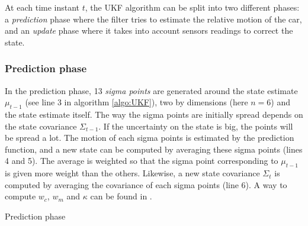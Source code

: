 \documentclass[10pt,a4paper, twocolumn]{article}
\begin{document}
At each time instant $t$, the UKF algorithm can be split into two different phases: a \textit{prediction} phase where the filter tries to estimate the relative motion of the car, and an \textit{update} phase where it takes into account sensors readings to correct the state.

\subsubsection{Prediction phase}
In the prediction phase, 13 \textit{sigma points} are generated around the state estimate $\mu_{t-1}$ (see line 3 in algorithm \ref{algo:UKF}), two by dimensions (here $n=6$) and the state estimate itself. The way the sigma points are initially spread depends on the state covariance $\Sigma_{t-1}$. If the uncertainty on the state is big, the points will be spread a lot. The motion of each sigma points is estimated by the prediction function, and a new state can be computed by averaging these sigma points (lines 4 and 5). The average is weighted so that the sigma point corresponding to $\mu_{t-1}$ is given more weight than the others. Likewise, a new state covariance $\Sigma_t$ is computed by averaging the covariance of each sigma points (line 6). A way to compute $w_c$, $w_m$ and $\kappa$ can be found in \cite{UKFForNonLinearEstimation}.

\begin{algorithm}[h]
	\SetAlgoNoLine
	\DontPrintSemicolon
	
	
	\caption{Prediction phase}
	\label{algo:predict}
\end{algorithm}


\end{document}
